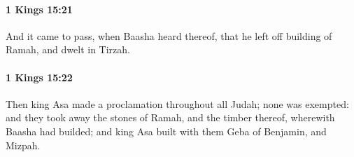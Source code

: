 		\paragraph{1 Kings 15:21} %
			\label{1KINGS-15-21}

			And it came to pass, when Baasha heard thereof, that he left off building of Ramah, and dwelt in Tirzah.


		\paragraph{1 Kings 15:22} %
			\label{1KINGS-15-22}

			Then king Asa made a proclamation throughout all Judah; none was exempted: and they took away the stones of Ramah, and the timber thereof, wherewith Baasha had builded; and king Asa built with them Geba of Benjamin, and Mizpah.



